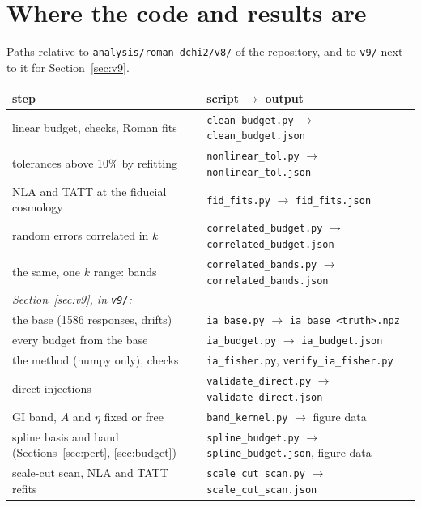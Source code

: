 \documentclass[11pt]{article}
\begin{document}
\section{Where the code and results are}
\label{app:code}

Paths relative to \texttt{analysis/roman\_dchi2/v8/} of the repository,
and to \texttt{v9/} next to it for Section~\ref{sec:v9}.

\begin{center}
  \footnotesize
  \begin{tabular}{ll}
    \toprule
    step & script $\rightarrow$ output \\
    \midrule
    linear budget, checks, Roman fits & \texttt{clean\_budget.py} $\rightarrow$ \texttt{clean\_budget.json} \\
    tolerances above 10\% by refitting & \texttt{nonlinear\_tol.py} $\rightarrow$ \texttt{nonlinear\_tol.json} \\
    NLA and TATT at the fiducial cosmology & \texttt{fid\_fits.py} $\rightarrow$ \texttt{fid\_fits.json} \\
    random errors correlated in $k$ & \texttt{correlated\_budget.py} $\rightarrow$ \texttt{correlated\_budget.json} \\
    the same, one $k$ range: bands & \texttt{correlated\_bands.py} $\rightarrow$ \texttt{correlated\_bands.json} \\
    \multicolumn{2}{l}{\textit{Section~\ref{sec:v9}, in \texttt{v9/}:}} \\
    the base (1586 responses, drifts) & \texttt{ia\_base.py} $\rightarrow$ \texttt{ia\_base\_<truth>.npz} \\
    every budget from the base & \texttt{ia\_budget.py} $\rightarrow$ \texttt{ia\_budget.json} \\
    the method (numpy only), checks & \texttt{ia\_fisher.py}, \texttt{verify\_ia\_fisher.py} \\
    direct injections & \texttt{validate\_direct.py} $\rightarrow$ \texttt{validate\_direct.json} \\
    GI band, $A$ and $\eta$ fixed or free & \texttt{band\_kernel.py} $\rightarrow$ figure data \\
    spline basis and band (Sections~\ref{sec:pert}, \ref{sec:budget}) & \texttt{spline\_budget.py} $\rightarrow$ \texttt{spline\_budget.json}, figure data \\
    scale-cut scan, NLA and TATT refits & \texttt{scale\_cut\_scan.py} $\rightarrow$ \texttt{scale\_cut\_scan.json} \\

\end{tabular}
\end{center}
\end{document}
